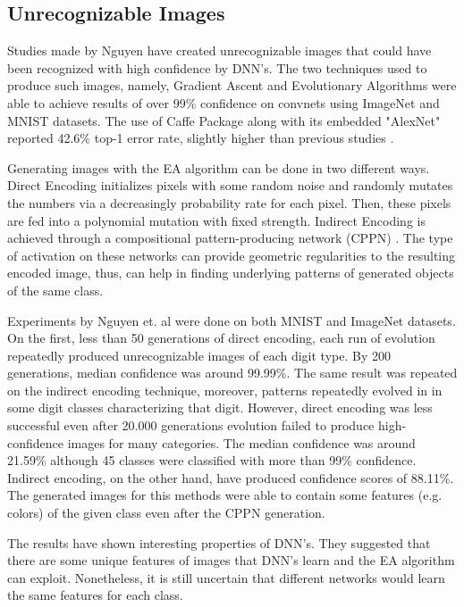 \documentclass{article}
\begin{document}
\subsection{Unrecognizable Images}\label{subsec:unrec}

Studies made by Nguyen have created unrecognizable images that could have been recognized with high confidence by DNN's. The two techniques used to produce such images, namely, Gradient Ascent and Evolutionary Algorithms \cite{lecun1998gradient}\cite{floreano2008bio} were able to achieve results of over 99\% confidence on convnets using ImageNet and MNIST datasets. The use of Caffe Package \cite{jia2014caffe} along with its embedded "AlexNet"  reported 42.6\% top-1 error rate, slightly higher than previous studies \cite{krizhevsky2012}.

Generating images with the EA algorithm can be done in two different ways. Direct Encoding initializes pixels with some random noise and randomly mutates the numbers via a decreasingly probability rate for each pixel. Then, these pixels are fed into a polynomial mutation with fixed strength. Indirect Encoding is achieved through a compositional pattern-producing network (CPPN) \cite{stanley2007compositional}. The type of activation on these networks can provide geometric regularities to the resulting encoded image, thus, can help in finding underlying patterns of generated objects of the same class.

Experiments by Nguyen et. al \cite{nguyen2015} were done on both  MNIST and ImageNet datasets. On the first, less than 50 generations of direct encoding, each run of evolution repeatedly produced unrecognizable images of each digit type. By 200 generations, median confidence was around 99.99\%. The same result was repeated on the indirect encoding technique, moreover, patterns repeatedly evolved in in some digit classes characterizing that digit. However, direct encoding was less successful even after 20.000 generations evolution failed to produce high-confidence images for many categories. The median confidence was around 21.59\% although 45 classes were classified with more than 99\% confidence. Indirect encoding, on the other hand, have produced confidence scores of 88.11\%. The generated images for this methods were able to contain some features (e.g. colors) of the given class even after the CPPN generation.

The results have shown interesting properties of DNN's. They suggested that there are some unique features of images that DNN's learn and the EA algorithm can exploit. Nonetheless, it is still uncertain that different networks would learn the same features for each class.
\end{document}
